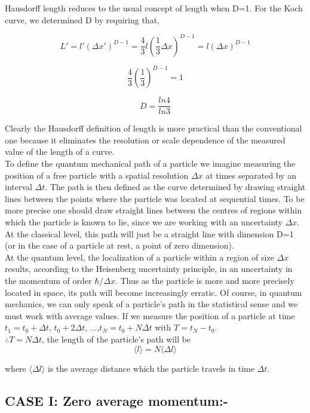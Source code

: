 \documentclass[14pt]{extarticle}
\begin{document}
Hausdorff length reduces to the usual concept of length when D=1. For the Koch curve, we determined D by requiring that,

$$L'=l'(\Delta x')^{D-1}= \frac{4}{3}l \left( \frac{1}{3} \Delta x \right)^{D-1} = l(\Delta x)^{D-1}$$

$$\frac{4}{3} \left( \frac{1}{3} \right)^{D-1} =1$$

$$D= \frac{ln4}{ln3}$$

Clearly the Hausdorff definition of length is more practical than the conventional one because it eliminates the resolution or scale dependence of the measured value of the length of a curve.\\
To define the quantum mechanical path of a particle we imagine measuring the position of a free particle with a spatial resolution $\Delta x$ at times separated by an interval $\Delta t$. The path is then defined as the curve determined by drawing straight lines between the points where the particle was located at sequential times. To be more precise one should draw straight lines between the centres of regions within which the particle is known to lie, since we are working with an uncertainty $\Delta x$. At the classical level, this path will just be a straight line with dimension D=1 (or in the case of a particle at rest, a point of zero dimension).\\

At the quantum level, the localization of a particle within a region of size $\Delta x$ results, according to the Heisenberg uncertainty principle, in an uncertainty in the momentum of order $\hbar/\Delta x$.  Thus as the particle is more and more precisely located in space, its path will become increasingly erratic. Of course, in quantum mechanics, we can only speak of a particle's path in the statistical sense and we must work with average values. If we measure the position of a particle at time $t_1=t_0+\Delta t$, $t_0+2\Delta t$, ...,$t_N= t_0+N\Delta t$ with $T=t_N-t_0$.\\

$\therefore T=N\Delta t$, the length of the particle's path will be\\

$$\langle l \rangle = N \langle \Delta l \rangle$$

where $\langle \Delta l \rangle$ is the average distance which the particle travels in time $\Delta t$.

\subsection{CASE I: Zero average momentum:-}
\end{document}
